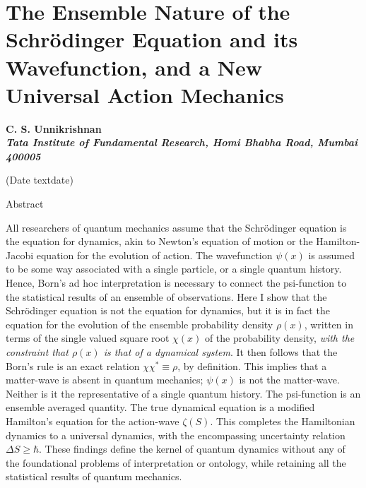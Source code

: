 \chapter{The Ensemble Nature of the Schr\"{o}dinger Equation and its Wavefunction, and a New Universal Action Mechanics}\label{chap27}


\begin{center}
\textbf{C. S. Unnikrishnan}\\
\textbf{\textit{Tata Institute of Fundamental Research, Homi Bhabha Road, Mumbai 400005}}
\end{center}

\begin{center}
(Date textdate)\\

\medskip

Abstract
\end{center}


All researchers of quantum mechanics assume that the Schr\"{o}dinger equation is the equation for
dynamics, akin to Newton's equation of motion or the Hamilton-Jacobi equation for the evolution
of action. The wavefunction $\psi(x)$ is assumed to be some way associated with a single particle,
or a single quantum history. Hence, Born's ad hoc interpretation is necessary to connect the psi-function to the statistical results of an ensemble of observations. Here I show that the Schr\"{o}dinger
equation is not the equation for dynamics, but it is in fact the equation for the evolution of
the ensemble probability density $\rho(x)$, written in terms of the single valued square root $\chi(x)$
of the probability density, \textit{with the constraint that $\rho(x)$ is that of a dynamical system}. It then
follows that the Born's rule is an exact relation $\chi \chi^{\ast} \equiv \rho$, by definition. This implies that a
matter-wave is absent in quantum mechanics; $\psi(x)$ is not the matter-wave. Neither is it the
representative of a single quantum history. The psi-function is an ensemble averaged quantity.
The true dynamical equation is a modified Hamilton's equation for the action-wave $\zeta(S)$. This
completes the Hamiltonian dynamics to a universal dynamics, with the encompassing uncertainty
relation $\Delta S \geq \hbar$. These findings define the kernel of quantum dynamics without any of the
foundational problems of interpretation or ontology, while retaining all the statistical results of
quantum mechanics.

